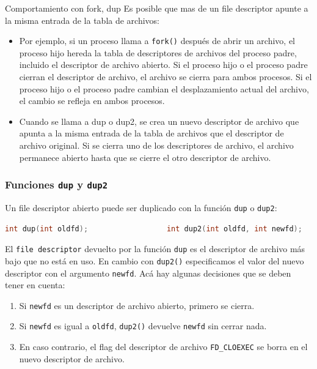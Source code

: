 \documentclass{article}
\begin{document}
\begin{summary}{Comportamiento con fork, dup}
    Es posible que mas de un file descriptor apunte a la misma entrada de la tabla de archivos:
    \begin{itemize}
        \item Por ejemplo, si un proceso llama a \texttt{fork()} después de abrir un archivo, el proceso hijo hereda la tabla de descriptores de archivos del proceso padre, incluido el descriptor de archivo abierto. Si el proceso hijo o el proceso padre cierran el descriptor de archivo, el archivo se cierra para ambos procesos. Si el proceso hijo o el proceso padre cambian el desplazamiento actual del archivo, el cambio se refleja en ambos procesos.
        \item Cuando se llama a dup o dup2, se crea un nuevo descriptor de archivo que apunta a la misma entrada de la tabla de archivos que el descriptor de archivo original. Si se cierra uno de los descriptores de archivo, el archivo permanece abierto hasta que se cierre el otro descriptor de archivo.
    \end{itemize}
\end{summary}

\subsubsection{Funciones \texttt{dup} y \texttt{dup2}}
Un file descriptor abierto puede ser duplicado con la función \texttt{dup} o \texttt{dup2}:
\begin{lstlisting}[language=C]
    int dup(int oldfd);                  int dup2(int oldfd, int newfd);
\end{lstlisting}
El \texttt{file descriptor} devuelto por la función \texttt{dup} es el descriptor de archivo más bajo que no está en uso. En cambio con \texttt{dup2()} especificamos el valor del nuevo descriptor con el argumento \texttt{newfd}. Acá hay algunas decisiones que se deben tener en cuenta:
\begin{enumerate}
    \item Si \texttt{newfd} es un descriptor de archivo abierto, primero se cierra.
    \item Si \texttt{newfd} es igual a \texttt{oldfd}, \texttt{dup2()} devuelve \texttt{newfd} sin cerrar nada.
    \item En caso contrario, el flag del descriptor de archivo \texttt{FD\_CLOEXEC} se borra en el nuevo descriptor de archivo.
\end{enumerate} 
\end{document}
